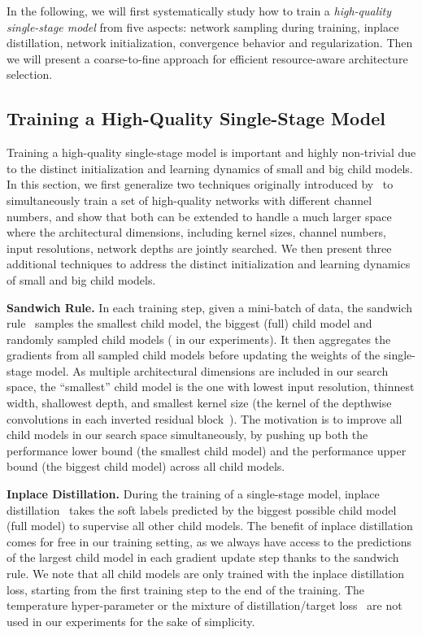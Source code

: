 \documentclass[runningheads]{llncs}
\begin{document}
In the following, we will first systematically study how to train a \emph{high-quality single-stage model} from five aspects: network sampling during training, inplace distillation, network initialization,  convergence behavior and regularization. Then we will present a coarse-to-fine approach for efficient resource-aware architecture selection.

\subsection{Training a High-Quality Single-Stage Model}\label{secs:train_one_stage}
Training a high-quality single-stage model is important and highly non-trivial due to the distinct initialization and learning dynamics of small and big child models. In this section, we first generalize two techniques originally introduced by~\cite{yu2019universally} to simultaneously train a set of high-quality networks with different channel numbers, and show that both can be extended to handle a much larger space where the architectural dimensions, including kernel sizes, channel numbers, input resolutions, network depths are jointly searched. We then present three additional techniques to address the distinct initialization and learning dynamics of small and big child models.

\textbf{Sandwich Rule.} In each training step, given a mini-batch of data, the sandwich rule~\cite{yu2019universally} samples the smallest child model, the biggest (full) child model and  randomly sampled child models ( in our experiments). It then aggregates the gradients from all sampled child models before updating the weights of the single-stage model. As multiple architectural dimensions are included in our search space, the ``smallest'' child model is the one with lowest input resolution, thinnest width, shallowest depth, and smallest kernel size (the kernel of the depthwise convolutions in each inverted residual block~\cite{sandler2018inverted}). The motivation is to improve all child models in our search space simultaneously, by pushing up both the performance lower bound (the smallest child model) and the performance upper bound (the biggest child model) across all child models.

\textbf{Inplace Distillation.} During the training of a single-stage model, inplace distillation~\cite{yu2019universally} takes the soft labels predicted by the biggest possible child model (full model) to supervise all other child models. The benefit of inplace distillation comes for free in our training setting, as we always have access to the predictions of the largest child model in each gradient update step thanks to the sandwich rule. We note that all child models are only trained with the inplace distillation loss, starting from the first training step to the end of the training. The temperature hyper-parameter or the mixture of distillation/target loss~\cite{hinton2015distilling} are not used in our experiments for the sake of simplicity.
\end{document}

